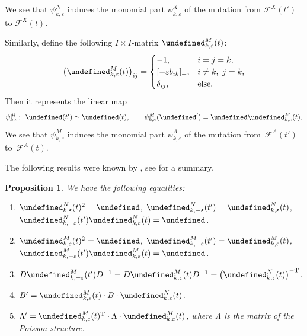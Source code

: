 \documentclass[10pt,a4paper]{amsart}
\newcommand{\opname}[1]{\operatorname{\mathsf{#1}}}
\newcommand{\cF}{{\mathcal F}}
\let\Mc\undefined
\let\Id\undefined
\let\trans\undefined
\let\ff\undefined
\let\uff\undefined
\newcommand{\Mc}{M^\circ}
\newcommand{\Id}{{\opname{Id}}}
\newcommand{\trans}{\opname{P}}
\newcommand{\ff}{\mathbf{f}}
\newcommand{\uff}{\underline{\ff}}
\numberwithin{equation}{section}
\newtheorem{Proposition}[Theorem]{Proposition}
 { \theoremstyle{definition}
\newtheorem{Definition}[Theorem]{Definition}
\newtheorem{Note}[Theorem]{Note}
\newtheorem{Example}[Theorem]{Example}
\newtheorem{Remark}[Theorem]{Remark}
\newtheorem{Assumption}[Theorem]{Assumption}
}
\begin{document}
We see that $\psi_{k,\varepsilon}^{N}$ induces the monomial part
$\psi_{k,\varepsilon}^{X}$ of the mutation from $\cF^{X}(t')$ to
$\cF^{X}(t)$.

Similarly, define the following $I\times I$-matrix $\trans_{k,\varepsilon}^{M}(t)$:
\begin{gather*}
\bigl(\trans_{k,\varepsilon}^{M}(t)\bigr)_{ij} = \begin{cases}
-1, & i=j=k,\\{}
[-\varepsilon b_{ik}]_{+}, & i\neq k,\ j=k,\\
\delta_{ij}, & \mathrm{else}.
\end{cases}
\end{gather*}
Then it represents the linear map
\[\psi_{k,\varepsilon}^{M}\colon\ \Mc(t')\simeq\Mc(t),\qquad \psi_{k,\varepsilon}^{M}(\uff') =\uff\trans_{k,\varepsilon}^{M}(t).\]
We see that $\psi_{k,\varepsilon}^{M}$ induces the monomial part
$\psi_{k,\varepsilon}^{A}$ of the mutation from~$\cF^{A}(t')$ to~$\cF^{A}(t)$.

The following results were known by \cite{BerensteinZelevinsky05,nakanishi2012tropical},
see \cite[Section~5.6]{Keller12} for a summary.

\begin{Proposition}\label{prop:matrix_properties} We have the following
equalities:
\begin{enumerate}\itemsep=0pt
 \item[$(1)$] $\trans_{k,\varepsilon}^{N}(t)^{2}=\Id$, $\trans_{k,-\varepsilon}^{N}(t')=\trans_{k,\varepsilon}^{N}(t)$,
 $\trans_{k,-\varepsilon}^{N}(t')\trans_{k,\varepsilon}^{N}(t)=\Id$.

 \item[$(2)$] $\trans_{k,\varepsilon}^{M}(t)^{2}=\Id$, $\trans_{k,-\varepsilon}^{M}(t')=\trans_{k,\varepsilon}^{M}(t)$,
 $\trans_{k,-\varepsilon}^{M}(t')\trans_{k,\varepsilon}^{M}(t)=\Id$.

 \item[$(3)$] $D\trans_{k,-\varepsilon}^{M}(t')D^{-1}=D\trans_{k,\varepsilon}^{M}(t)D^{-1}=\bigl(\trans_{k,\varepsilon}^{N}(t)\bigr)^{\rm -T}$.

 \item[$(4)$] $B'=\trans_{k,\varepsilon}^{M}(t)\cdot B\cdot\trans_{k,\varepsilon}^{N}(t)$.

 \item[$(5)$] $\Lambda'=\trans_{k,\varepsilon}^{M}(t)^{\rm T}\cdot\Lambda\cdot\trans_{k,\varepsilon}^{M}(t)$, where $\Lambda$ is the matrix of the Poisson structure.
\end{enumerate}
\end{Proposition}
\end{document}
